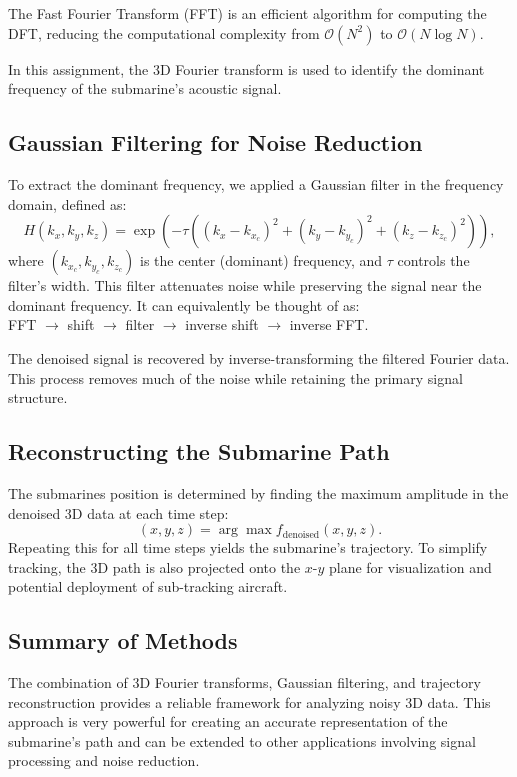 \documentclass[11pt]{amsart}
\begin{document}
The Fast Fourier Transform (FFT) is an efficient algorithm for computing the DFT, reducing the computational complexity from $\mathcal{O}(N^2)$ to $\mathcal{O}(N \log N)$.

In this assignment, the 3D Fourier transform is used to identify the dominant frequency of the submarine's acoustic signal.

\subsection{Gaussian Filtering for Noise Reduction}

To extract the dominant frequency, we applied a Gaussian filter in the frequency domain, defined as:
\[
H(k_x, k_y, k_z) = \exp\left(-\tau \left((k_x - k_{x_c})^2 + (k_y - k_{y_c})^2 + (k_z - k_{z_c})^2\right)\right),
\]
where $(k_{x_c}, k_{y_c}, k_{z_c})$ is the center (dominant) frequency, and $\tau$ controls the filter's width. This filter attenuates noise while preserving the signal near the dominant frequency. It can equivalently be thought of as:\\
FFT $\to$ shift $\to$ filter $\to$ inverse shift $\to$ inverse FFT.

The denoised signal is recovered by inverse-transforming the filtered Fourier data. This process removes much of the noise while retaining the primary signal structure.

\subsection{Reconstructing the Submarine Path}

The submarines position is determined by finding the maximum amplitude in the denoised 3D data at each time step:
\[
(x, y, z) = \arg\max f_{\text{denoised}}(x, y, z).
\]
Repeating this for all time steps yields the submarine's trajectory. To simplify tracking, the 3D path is also projected onto the $x$-$y$ plane for visualization and potential deployment of sub-tracking aircraft.

\subsection{Summary of Methods}

The combination of 3D Fourier transforms, Gaussian filtering, and trajectory reconstruction provides a reliable framework for analyzing noisy 3D data. This approach is very powerful for creating an accurate representation of the submarine's path and can be extended to other applications involving signal processing and noise reduction.
\end{document}
